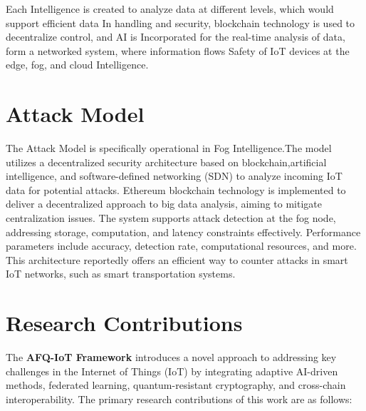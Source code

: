 \documentclass[12pt, oneside]{report}
\begin{document}
Each Intelligence is created to analyze data at different levels, which would support efficient data
In handling and security, blockchain technology is used to decentralize control, and AI is
Incorporated for the real-time analysis of data, form a networked system, where information flows
Safety of IoT devices at the edge, fog, and cloud Intelligence.
 
\section{Attack Model}
The Attack Model is specifically operational in Fog Intelligence.The model utilizes a decentralized security architecture based on blockchain,artificial intelligence, and software-defined networking (SDN) to analyze incoming IoT data for potential attacks. Ethereum blockchain technology is implemented to deliver a decentralized approach to big data analysis, aiming to mitigate centralization issues. The system supports attack detection at the fog node, addressing storage, computation, and latency constraints effectively. Performance parameters include accuracy, detection rate, computational resources, and more. This architecture reportedly offers an efficient way to counter attacks in smart IoT networks, such as smart transportation systems.
\section{Research Contributions}

The \textbf{AFQ-IoT Framework} introduces a novel approach to addressing key challenges in the Internet of Things (IoT) by integrating adaptive AI-driven methods, federated learning, quantum-resistant cryptography, and cross-chain interoperability. The primary research contributions of this work are as follows:
\end{document}
